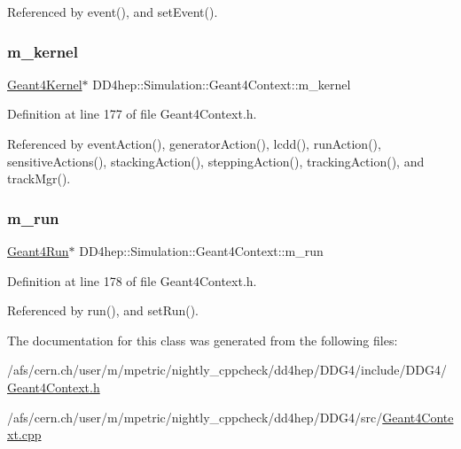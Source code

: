 Referenced by event(), and set\+Event().

\hypertarget{class_d_d4hep_1_1_simulation_1_1_geant4_context_a039b270efa705522ec33989d69518c49}{}\label{class_d_d4hep_1_1_simulation_1_1_geant4_context_a039b270efa705522ec33989d69518c49} 
\subsubsection{\texorpdfstring{m\+\_\+kernel}{m\_kernel}}
{\footnotesize\ttfamily \hyperlink{class_d_d4hep_1_1_simulation_1_1_geant4_kernel}{Geant4\+Kernel}$\ast$ D\+D4hep\+::\+Simulation\+::\+Geant4\+Context\+::m\+\_\+kernel\hspace{0.3cm}{\ttfamily [protected]}}



Definition at line 177 of file Geant4\+Context.\+h.



Referenced by event\+Action(), generator\+Action(), lcdd(), run\+Action(), sensitive\+Actions(), stacking\+Action(), stepping\+Action(), tracking\+Action(), and track\+Mgr().

\hypertarget{class_d_d4hep_1_1_simulation_1_1_geant4_context_a87c4aed90cd013934b16b5307b65184c}{}\label{class_d_d4hep_1_1_simulation_1_1_geant4_context_a87c4aed90cd013934b16b5307b65184c} 
\subsubsection{\texorpdfstring{m\+\_\+run}{m\_run}}
{\footnotesize\ttfamily \hyperlink{class_d_d4hep_1_1_simulation_1_1_geant4_run}{Geant4\+Run}$\ast$ D\+D4hep\+::\+Simulation\+::\+Geant4\+Context\+::m\+\_\+run\hspace{0.3cm}{\ttfamily [protected]}}



Definition at line 178 of file Geant4\+Context.\+h.



Referenced by run(), and set\+Run().



The documentation for this class was generated from the following files\+:\begin{DoxyCompactItemize}
\item 
/afs/cern.\+ch/user/m/mpetric/nightly\+\_\+cppcheck/dd4hep/\+D\+D\+G4/include/\+D\+D\+G4/\hyperlink{_geant4_context_8h}{Geant4\+Context.\+h}\item 
/afs/cern.\+ch/user/m/mpetric/nightly\+\_\+cppcheck/dd4hep/\+D\+D\+G4/src/\hyperlink{_geant4_context_8cpp}{Geant4\+Context.\+cpp}\end{DoxyCompactItemize}
